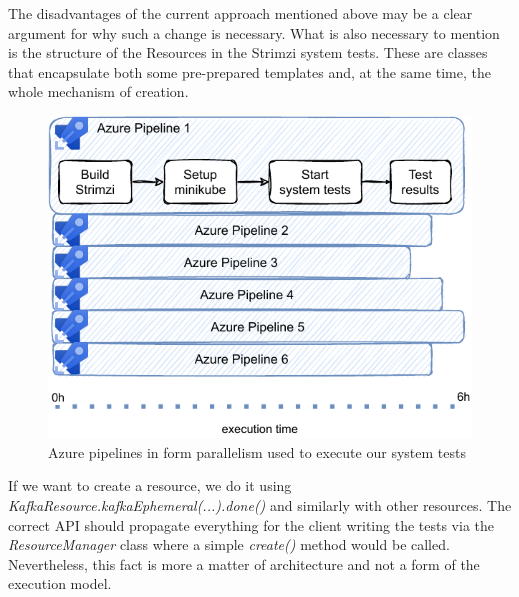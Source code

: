The disadvantages of the current approach mentioned above may be a clear argument for why such a change is necessary.
What is also necessary to mention is the structure of the Resources in the Strimzi system tests.
These are classes that encapsulate both some pre-prepared templates and, at the same time, the whole mechanism of creation.
\begin{figure}[!ht]
    \centering
    \includegraphics[scale=1]{obrazky-figures/06-proposal-of-parallel-approach/01a-azure_pipelines_with_test_results.pdf}
    \caption{Azure pipelines in form parallelism used to execute our system tests}
    \label{05:fig:azurepiplines}
\end{figure}
If we want to create a resource, we do it using \emph{KafkaResource.kafkaEphemeral(...).done()} and similarly with other resources.
The correct API should propagate everything for the client writing the tests via the \emph{ResourceManager} class where a simple \emph{create()} method would be called.
Nevertheless, this fact is more a matter of architecture and not a form of the execution model.

